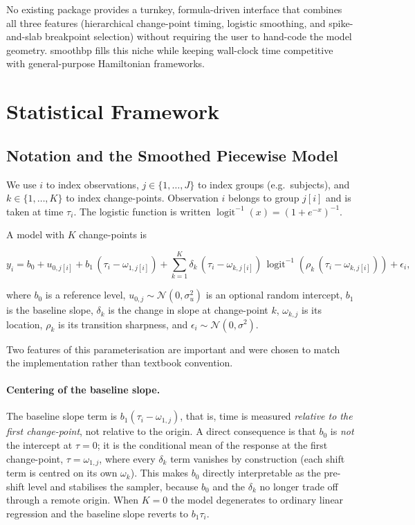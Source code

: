 \documentclass[12pt]{article}
\newcommand{\pkg}[1]{\textsf{#1}}
\begin{document}
No existing package provides a turnkey, formula-driven interface that combines all three features (hierarchical change-point timing, logistic smoothing, and spike-and-slab breakpoint selection) without requiring the user to hand-code the model geometry. \pkg{smoothbp} fills this niche while keeping wall-clock time competitive with general-purpose Hamiltonian frameworks.

\section{Statistical Framework}

\subsection{Notation and the Smoothed Piecewise Model}

We use $i$ to index observations, $j \in \{1, \dots, J\}$ to index groups (e.g.\ subjects), and $k \in \{1, \dots, K\}$ to index change-points. Observation $i$ belongs to group $j[i]$ and is taken at time $\tau_i$. The logistic function is written $\operatorname{logit}^{-1}(x) = (1 + e^{-x})^{-1}$.

A model with $K$ change-points is

\begin{equation}
y_{i} = b_0 + u_{0,j[i]} + b_1\,(\tau_{i} - \omega_{1,j[i]}) + \sum_{k=1}^K \delta_{k}\,(\tau_{i} - \omega_{k,j[i]})\,\operatorname{logit}^{-1}\!\left( \rho_k\,(\tau_{i} - \omega_{k,j[i]}) \right) + \epsilon_{i},
\end{equation}

where $b_0$ is a reference level, $u_{0,j} \sim \mathcal{N}(0, \sigma_u^2)$ is an optional random intercept, $b_1$ is the baseline slope, $\delta_k$ is the change in slope at change-point $k$, $\omega_{k,j}$ is its location, $\rho_k$ is its transition sharpness, and $\epsilon_{i} \sim \mathcal{N}(0, \sigma^2)$.

Two features of this parameterisation are important and were chosen to match the implementation rather than textbook convention.

\paragraph{Centering of the baseline slope.} The baseline slope term is $b_1(\tau_i - \omega_{1,j})$, that is, time is measured \emph{relative to the first change-point}, not relative to the origin. A direct consequence is that $b_0$ is \emph{not} the intercept at $\tau = 0$; it is the conditional mean of the response at the first change-point, $\tau = \omega_{1,j}$, where every $\delta_k$ term vanishes by construction (each shift term is centred on its own $\omega_k$). This makes $b_0$ directly interpretable as the pre-shift level and stabilises the sampler, because $b_0$ and the $\delta_k$ no longer trade off through a remote origin. When $K = 0$ the model degenerates to ordinary linear regression and the baseline slope reverts to $b_1\tau_i$.
\end{document}
